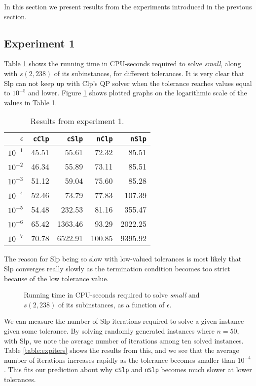 In this section we present results from the experiments introduced in the
previous section.

\subsection*{Experiment 1}
Table \ref{table:expone} shows the running time in CPU-seconds required
to solve \textit{small}, along with $s(2, 238)$ of its subinstances, for
different tolerances.
It is very clear that Slp can not
keep up with Clp's QP solver when the tolerance reaches values equal to
$10^{-5}$ and lower.
Figure \ref{fig:smalltolerance} shows plotted graphs on the logarithmic scale
of the values in Table \ref{table:expone}.

\begin{table}[ht!]
\centering
\caption{Results from experiment 1.}
\begin{tabular}{rrrrr}
$\epsilon$ & \texttt{cClp} & \texttt{cSlp} & \texttt{nClp} & \texttt{nSlp} \\ \hline
$10^{-1}$ & 45.51 & 55.61 & 72.32 & 85.51 \\
$10^{-2}$ & 46.34 & 55.89 & 73.11 & 85.51 \\
$10^{-3}$ & 51.12 & 59.04 & 75.60 & 85.28 \\
$10^{-4}$ & 52.46 & 73.79 & 77.83 & 107.39 \\
$10^{-5}$ & 54.48 & 232.53 & 81.16 & 355.47 \\
$10^{-6}$ & 65.42 & 1363.46 & 93.29 & 2022.25 \\
$10^{-7}$ & 70.78 & 6522.91 & 100.85 & 9395.92
\end{tabular}
\label{table:expone}
\end{table}

The reason for Slp being so slow with low-valued tolerances is most likely that
Slp converges really slowly as the termination condition becomes too strict
because of the low tolerance value.
\begin{figure}[ht!]
    \centering
    
    \caption{Running time in CPU-seconds required to solve \textit{small}
             and $s(2, 238)$ of its subinstances, as a function of $\epsilon$.}
    \label{fig:smalltolerance}
\end{figure}
We can measure the number of Slp iterations required to solve a given instance
given some tolerance. By solving randomly generated instances where $n = 50$,
with Slp, we note the average number of iterations among ten solved
instances. Table \ref{table:expiters} shows the results from this, and we see
that the average number of iterations increases rapidly as the tolerance
becomes smaller than $10^{-4}$. This fits our prediction about why
\texttt{cSlp} and \texttt{nSlp} becomes much slower at lower tolerances.

